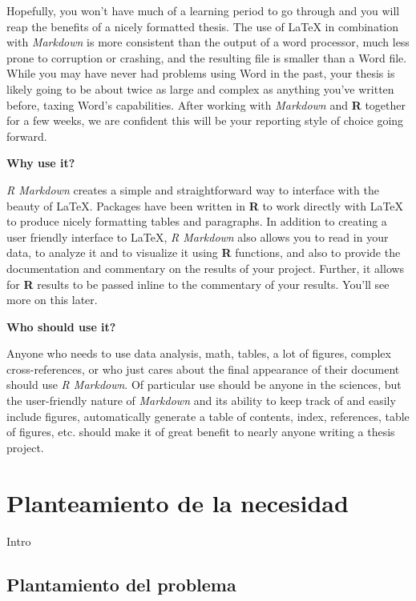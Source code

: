\documentclass[12pt,twoside]{reedthesis}
\theoremstyle{definition}
\theoremstyle{definition}
\theoremstyle{definition}
\theoremstyle{remark}
\begin{document}
Hopefully, you won't have much of a learning period to go through and
you will reap the benefits of a nicely formatted thesis. The use of
LaTeX in combination with \emph{Markdown} is more consistent than the
output of a word processor, much less prone to corruption or crashing,
and the resulting file is smaller than a Word file. While you may have
never had problems using Word in the past, your thesis is likely going
to be about twice as large and complex as anything you've written
before, taxing Word's capabilities. After working with \emph{Markdown}
and \textbf{R} together for a few weeks, we are confident this will be
your reporting style of choice going forward.

\textbf{Why use it?}

\emph{R Markdown} creates a simple and straightforward way to interface
with the beauty of LaTeX. Packages have been written in \textbf{R} to
work directly with LaTeX to produce nicely formatting tables and
paragraphs. In addition to creating a user friendly interface to LaTeX,
\emph{R Markdown} also allows you to read in your data, to analyze it
and to visualize it using \textbf{R} functions, and also to provide the
documentation and commentary on the results of your project. Further, it
allows for \textbf{R} results to be passed inline to the commentary of
your results. You'll see more on this later.

\textbf{Who should use it?}

Anyone who needs to use data analysis, math, tables, a lot of figures,
complex cross-references, or who just cares about the final appearance
of their document should use \emph{R Markdown}. Of particular use should
be anyone in the sciences, but the user-friendly nature of
\emph{Markdown} and its ability to keep track of and easily include
figures, automatically generate a table of contents, index, references,
table of figures, etc. should make it of great benefit to nearly anyone
writing a thesis project.

\hypertarget{rmd-basics}{%
\chapter{Planteamiento de la necesidad}\label{rmd-basics}}

Intro

\hypertarget{plantamiento-del-problema}{%
\section{Plantamiento del problema}\label{plantamiento-del-problema}}
\end{document}
